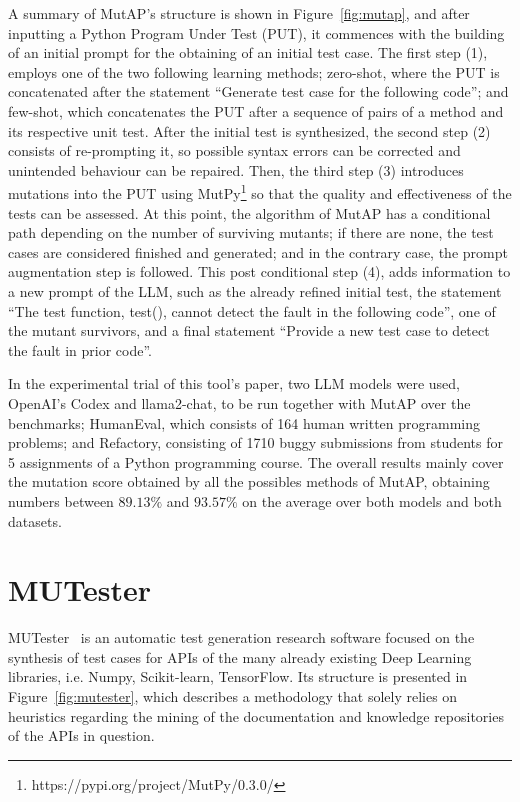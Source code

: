 \documentclass[%
  chapterprefix=false,%
  open=right,%
  twoside=true,%
  paper=a4,%
  logofile={Figures/logo.png},%
  thesistype=master,%
  UKenglish,%
]{se2thesis}
\begin{document}
A summary of MutAP's structure is shown in Figure~\ref{fig:mutap}, and after inputting a Python Program Under Test (PUT), it commences with the building of an initial prompt for the obtaining of an initial test case.
The first step (1), employs one of the two following learning methods; zero-shot, where the PUT is concatenated after the statement  ``Generate test case for the following code''; and few-shot, which concatenates the PUT after a sequence of pairs of a method and its respective unit test.
After the initial test is synthesized, the second step (2) consists of re-prompting it, so possible syntax errors can be corrected and unintended behaviour can be repaired.
Then, the third step (3) introduces mutations into the PUT using MutPy\footnote{https://pypi.org/project/MutPy/0.3.0/} so that the quality and effectiveness of the tests can be assessed.
At this point, the algorithm of MutAP has a conditional path depending on the number of surviving mutants; if there are none, the test cases are considered finished and generated; and in the contrary case, the prompt augmentation step is followed.
This post conditional step (4), adds information to a new prompt of the LLM, such as the already refined initial test, the statement ``The test function, test(), cannot detect the fault in the
following code'', one of the mutant survivors, and a final statement ``Provide a new test case to detect the fault in prior code''.

In the experimental trial of this tool's paper, two LLM models were used, OpenAI's Codex and llama2-chat, to be run together with MutAP over the benchmarks; HumanEval, which consists of 164 human written programming problems; and Refactory, consisting of 1710 buggy submissions from students for 5 assignments of a Python programming course.
The overall results mainly cover the mutation score obtained by all the possibles methods of MutAP, obtaining numbers between \(89.13\%\) and \(93.57\%\) on the average over both models and both datasets.

\section{MUTester}

MUTester~\cite{DBLP:journals/corr/abs-2307-00404} is an automatic test generation research software focused on the synthesis of test cases for APIs of the many already existing Deep Learning libraries, i.e. Numpy, Scikit-learn, TensorFlow.
Its structure is presented in Figure~\ref{fig:mutester}, which describes a methodology that solely relies on heuristics regarding the mining of the documentation and knowledge repositories of the APIs in question. 
\end{document}
